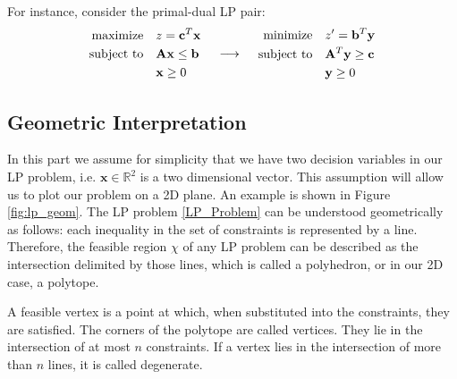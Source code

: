 For instance, consider the primal-dual LP pair:
\[
    \begin{array}{c@{\quad}c@{\quad}c}
        \begin{aligned}
            \text{maximize} \quad   & z = \mathbf{c}^T \mathbf{x}           \\
            \text{subject to} \quad & \mathbf{A} \mathbf{x} \leq \mathbf{b} \\
                                    & \mathbf{x} \geq 0                     \\
        \end{aligned}
         &
        \begin{array}{c}
            \longrightarrow
        \end{array}
         &
        \begin{aligned}
            \text{minimize} \quad   & z' = \mathbf{b}^T \mathbf{y}            \\
            \text{subject to} \quad & \mathbf{A}^T \mathbf{y} \geq \mathbf{c} \\
                                    & \mathbf{y} \geq 0                       \\
        \end{aligned}
    \end{array}
\]

\subsection{Geometric Interpretation}
In this part we assume for simplicity that we have two decision variables in our LP problem, i.e. $\mathbf{x} \in \mathbb{R}^2 $ is a two dimensional vector. This assumption will allow us to plot our problem on a 2D plane. An example is shown in Figure \ref{fig:lp_geom}. The LP problem \ref{LP_Problem} can be understood geometrically as follows: each inequality in the set of constraints is represented by a line. Therefore, the feasible region $\chi$ of any LP problem can be described as the intersection delimited by those lines, which is called a polyhedron, or in our 2D case, a polytope.

A feasible vertex is a point at which, when substituted into the constraints, they are satisfied.
The corners of the polytope are called vertices.
They lie in the intersection of at most $n$ constraints. If a vertex lies in the intersection of more than $n$ lines, it is called degenerate.


